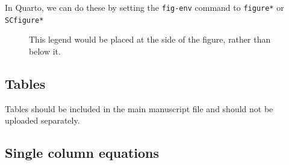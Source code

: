 \documentclass[
  9pt,
  twocolumn,
  twoside]{pnas-new}
\begin{document}
In Quarto, we can do these by setting the \texttt{fig-env} command to
\texttt{figure*} or \texttt{SCfigure*}

\begin{figure}


\caption{\label{fig-side}This legend would be placed at the side of the
figure, rather than below it.}

\end{figure}%

\subsection*{Tables}\label{tables}

Tables should be included in the main manuscript file and should not be
uploaded separately.

\subsection*{Single column equations}\label{single-column-equations}
\end{document}
